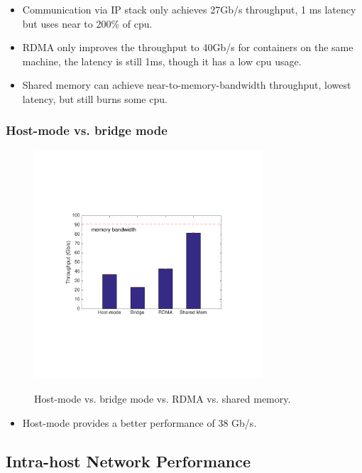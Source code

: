 \begin{itemize}
  \item Communication via IP stack only achieves 27Gb/s throughput, 1 ms latency but uses near to 200\% of cpu.
  \item RDMA only improves the throughput to 40Gb/s for containers on the same machine, the latency is still 1ms, though it has a low cpu usage.
  \item Shared memory can achieve near-to-memory-bandwidth throughput, lowest latency, but still burns some cpu. 
\end{itemize}


\subsubsection{Host-mode vs. bridge mode}

\begin{figure}[!ht]
     \centering 
     \includegraphics[width=3.35in]{figures/motivation/eval_bw_host_bridge.pdf} 
     \label{fig:eval_bw_host_bridge}
     \caption{ Host-mode vs. bridge mode vs. RDMA vs. shared memory.} 
\end{figure} 

\begin{itemize}
  \item Host-mode provides a better performance of 38 Gb/s. 
\end{itemize}

\subsection{Intra-host Network Performance}


